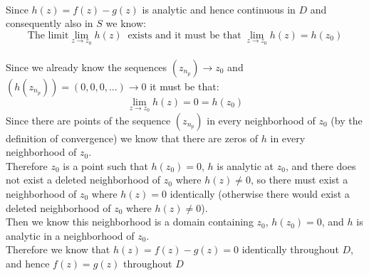 \documentclass{article}
\begin{document}
\begin{center}
    \\Since $h(z) = f(z) - g(z)$ is analytic and hence continuous in $D$ and consequently also in $S$ we know:
    \[\text{The limit}\lim _{z\rightarrow z_0} h(z)\;\;\text{exists and it must be that}\;\lim _{z\rightarrow z_0} h(z) = h(z_0)\]
    \\Since we already know the sequences $(z_{n_p})\rightarrow z_0$ and $(h(z_{n_p})) = (0, 0, 0, ...)\rightarrow 0$ it must be that:
    \[\lim _{z\rightarrow z_0} h(z) = 0 = h(z_0)\]
    Since there are points of the sequence $(z_{n_p})$ in every neighborhood of $z_0$ (by the definition of convergence) we know that there are zeros of $h$ in every neighborhood of $z_0$.
    \\Therefore $z_0$ is a point such that $h(z_0) = 0$, $h$ is analytic at $z_0$, and there does not exist a deleted neighborhood of $z_0$ where $h(z)\neq 0$, so there must exist a neighborhood of $z_0$ where $h(z) = 0$ identically (otherwise there would exist a deleted neighborhood of $z_0$ where $h(z)\neq 0$).
    \\Then we know this neighborhood is a domain containing $z_0$, $h(z_0) = 0$, and $h$ is analytic in a neighborhood of $z_0$.
    \\Therefore we know that $h(z) = f(z) - g(z) = 0$ identically throughout $D$, and hence $f(z) = g(z)$ throughout $D$ \qedsymbol
\end{center}
\end{document}
